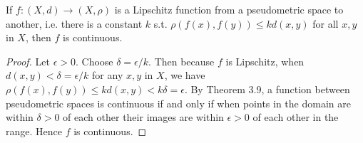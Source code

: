 \setcounter{question}{4} %
\begin{question}[Ewing]
If $f\colon (X,d)\to(X,\rho)$ is a Lipschitz function from a pseudometric space to another, i.e. there is a constant $k$ s.t. $\rho(f(x),f(y))\le kd(x,y)$ for all $x,y$ in $X$, then $f$ is continuous.
\end{question}
\begin{proof}
Let $\epsilon>0$. Choose $\delta=\epsilon/k$. Then because $f$ is Lipschitz, when $d(x,y)<\delta=\epsilon/k$ for any $x,y$ in $X$, we have $\rho(f(x),f(y))\le kd(x,y)<k\delta=\epsilon$. By Theorem 3.9, a function between pseudometric spaces is continuous if and only if when points in the domain are within $\delta>0$ of each other their images are within $\epsilon>0$ of each other in the range. Hence $f$ is continuous.
\end{proof}

